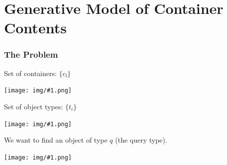 \documentclass{beamer}
\def \spL [#1]{\texttt{[image: img/\#1.png]}}
\begin{document}
\section{Generative Model of Container Contents}
\begin{frame}
	\frametitle{The Problem}
	\begin{center}
		\vspace{-0.13in}
		Set of containers: $\{c_l\}$

		\spL[3-unknown-containers]

		Set of object types: $\{t_i\}$

		\spL[shape-universe-small]

		We want to find an object of type $q$ (the query type).

		\spL[blue-circle]

	\end{center}
\end{frame}
\end{document}
